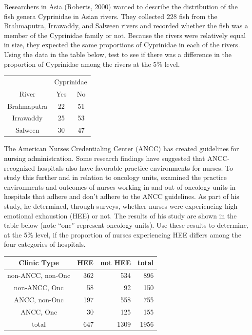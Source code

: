 \documentclass[10pt,openany]{book}\usepackage[]{graphicx}\usepackage[]{color}
\begin{document}
\begin{exsection}
  \item \label{revex:ChiCyprin} Researchers in Asia (Roberts, 2000) wanted to describe the distribution of the fish genera Cyprinidae in Asian rivers.  They collected 228 fish from the Brahmaputra, Irrawaddy, and Salween rivers and recorded whether the fish was a member of the Cyprinidae family or not.  Because the rivers were relatively equal in size, they expected the same proportions of Cyprinidae in each of the rivers.  Using the data in the table below, test to see if there was a difference in the proportion of Cyprinidae among the rivers at the 5\% level. 
  \begin{center}
    \begin{tabular}{|c|c|c|}
      \multicolumn{1}{c}{} & \multicolumn{2}{c}{Cyprinidae} \\
      \cline{2-3}
      \multicolumn{1}{c|}{River} & Yes & No \\
      \hline
      Brahmaputra & 22 & 51 \\
      \hline
      Irrawaddy & 25 & 53 \\
      \hline
      Salween & 30 & 47 \\
      \hline
    \end{tabular}
  \end{center}

  \item \label{revex:ChiNurse} The American Nurses Credentialing Center (ANCC) has created guidelines for nursing administration.  Some research findings have suggested that ANCC-recognized hospitals also have favorable practice environments for nurses.  To study this further and in relation to oncology units, \cite{Friese2005} examined the practice environments and outcomes of nurses working in and out of oncology units in hospitals that adhere and don't adhere to the ANCC guidelines.  As part of his study, he determined, through surveys, whether nurses were experiencing high emotional exhaustion (HEE) or not.  The results of his study are shown in the table below (note ``onc'' represent oncology units).  Use these results to determine, at the 5\% level, if the proportion of nurses experiencing HEE differs among the four categories of hospitals. 
  \begin{center}
    \begin{tabular}{c|rr|r}
      \hline\hline
      Clinic Type & \multicolumn{1}{c}{HEE} & \multicolumn{1}{c|}{not HEE} & \multicolumn{1}{c}{total} \\
      \hline
      non-ANCC, non-Onc & 362 & 534 & 896 \\
      non-ANCC, Onc     & 58  & 92  & 150 \\
      ANCC, non-Onc     & 197 & 558 & 755 \\
      ANCC, Onc         & 30  & 125 & 155 \\
      \hline
      total & 647 & 1309 & 1956 \\
      \hline\hline
    \end{tabular}
  \end{center}


\end{exsection}
\end{document}
